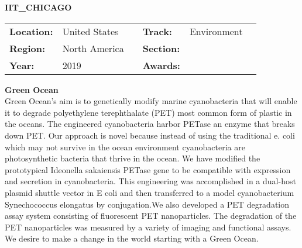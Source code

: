\textbf{\uppercase{IIT\_Chicago}} \FloatBarrier \begin{table}[h] \begin{tabular}{lp{2.5cm}llll} \textbf{Location:} & United States & \multicolumn{1}{|l}{} & \textbf{Track:}   & Environment \\ \textbf{Region:}   & North America   & \multicolumn{1}{|l}{} & \textbf{Section:} &  \\ \textbf{Year:}     & 2019   & \multicolumn{1}{|l}{} & \textbf{Awards:}  & \end{tabular} \end{table} \FloatBarrier \noindent\textbf{Green Ocean} \vspace{.2cm}\\ 
Green Ocean’s aim is to genetically modify marine cyanobacteria that will enable it to degrade polyethylene terephthalate (PET) most common form of plastic in the oceans. The engineered cyanobacteria harbor PETase an enzyme that breaks down PET. Our approach is novel because instead of using the traditional e. coli which may not survive in the ocean environment cyanobacteria are photosynthetic bacteria that thrive in the ocean. We have modified the prototypical Ideonella sakaiensis  PETase gene to be compatible with expression and secretion in cyanobacteria. This engineering was accomplished in a dual-host plasmid shuttle vector in E coli and then transferred to a model cyanobacterium Synechococcus elongatus by conjugation.We also developed a PET degradation assay system consisting of fluorescent PET nanoparticles. The degradation of the PET nanoparticles was measured by a variety of imaging and functional assays. We desire to make a change in the world starting with a Green Ocean. 
\vspace{2cm} $ $
\pagebreak

